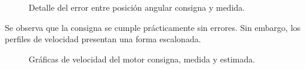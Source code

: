 \documentclass[a4paper, 10pt, onecolumn,journal]{ieeeconf}
\begin{document}
\begin{figure}[H]
	\centering
	\begin{adjustbox}{scale=0.5,max width=\columnwidth}
	\end{adjustbox}
	\caption{Detalle del error entre posición angular consigna y medida.}
	\label{Detalle del error entre posición angular consigna y medida }
\end{figure}
Se observa que la consigna se cumple prácticamente sin errores. Sin embargo, los perfiles de velocidad presentan una forma escalonada.
\begin{figure}[H]
	\centering
	\begin{adjustbox}{max width=\columnwidth}
	\end{adjustbox}
	\caption{Gráficas de velocidad del motor consigna, medida y estimada.}
	\label{Gráficas de velocidad del motor consigna, medida y estimada}
\end{figure}
\end{document}
